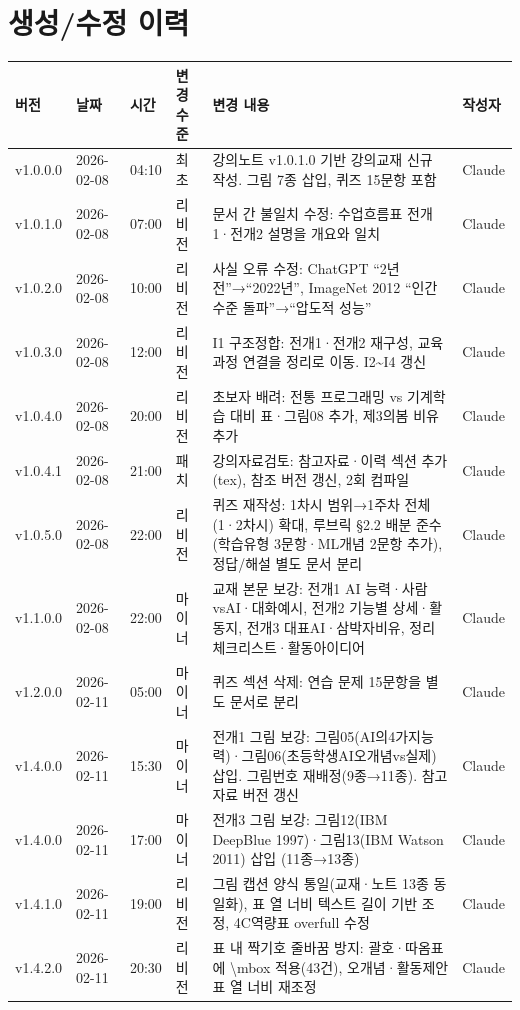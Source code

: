\documentclass[11pt,a4paper]{article}
\renewcommand{\arraystretch}{1.4}
\begin{document}
\section*{생성/수정 이력}

\begin{center}
\renewcommand{\arraystretch}{1.3}
\begin{tabular}{|l|l|l|l|p{4.5cm}|l|}
\hline
\rowcolor{tableheader}
\textbf{버전} & \textbf{날짜} & \textbf{시간} & \textbf{변경 수준} & \textbf{변경 내용} & \textbf{작성자} \\
\hline
v1.0.0.0 & 2026-02-08 & 04:10 & 최초 & 강의노트 v1.0.1.0 기반 강의교재 신규 작성. 그림 7종 삽입, 퀴즈 15문항 포함 & Claude \\
\hline
v1.0.1.0 & 2026-02-08 & 07:00 & 리비전 & 문서 간 불일치 수정: 수업흐름표 전개1·전개2 설명을 개요와 일치 & Claude \\
\hline
v1.0.2.0 & 2026-02-08 & 10:00 & 리비전 & 사실 오류 수정: ChatGPT ``2년 전''→``2022년'', ImageNet 2012 ``인간 수준 돌파''→``압도적 성능'' & Claude \\
\hline
v1.0.3.0 & 2026-02-08 & 12:00 & 리비전 & I1 구조정합: 전개1·전개2 재구성, 교육과정 연결을 정리로 이동. I2\textasciitilde I4 갱신 & Claude \\
\hline
v1.0.4.0 & 2026-02-08 & 20:00 & 리비전 & 초보자 배려: 전통 프로그래밍 vs 기계학습 대비 표·그림08 추가, 제3의봄 비유 추가 & Claude \\
\hline
v1.0.4.1 & 2026-02-08 & 21:00 & 패치 & 강의자료검토: 참고자료·이력 섹션 추가(tex), 참조 버전 갱신, 2회 컴파일 & Claude \\
\hline
v1.0.5.0 & 2026-02-08 & 22:00 & 리비전 & 퀴즈 재작성: 1차시 범위→1주차 전체(1·2차시) 확대, 루브릭 \S 2.2 배분 준수(학습유형 3문항·ML개념 2문항 추가), 정답/해설 별도 문서 분리 & Claude \\
\hline
v1.1.0.0 & 2026-02-08 & 22:00 & 마이너 & 교재 본문 보강: 전개1 AI 능력·사람vsAI·대화예시, 전개2 기능별 상세·활동지, 전개3 대표AI·삼박자비유, 정리 체크리스트·활동아이디어 & Claude \\
\hline
v1.2.0.0 & 2026-02-11 & 05:00 & 마이너 & 퀴즈 섹션 삭제: 연습 문제 15문항을 별도 문서로 분리 & Claude \\
\hline
v1.4.0.0 & 2026-02-11 & 15:30 & 마이너 & 전개1 그림 보강: 그림05(AI의4가지능력)·그림06(초등학생AI오개념vs실제) 삽입. 그림번호 재배정(9종→11종). 참고자료 버전 갱신 & Claude \\
\hline
v1.4.0.0 & 2026-02-11 & 17:00 & 마이너 & 전개3 그림 보강: 그림12(IBM DeepBlue 1997)·그림13(IBM Watson 2011) 삽입 (11종→13종) & Claude \\
\hline
v1.4.1.0 & 2026-02-11 & 19:00 & 리비전 & 그림 캡션 양식 통일(교재·노트 13종 동일화), 표 열 너비 텍스트 길이 기반 조정, 4C역량표 overfull 수정 & Claude \\
\hline
v1.4.2.0 & 2026-02-11 & 20:30 & 리비전 & 표 내 짝기호 줄바꿈 방지: 괄호·따옴표에 \textbackslash mbox 적용(43건), 오개념·활동제안 표 열 너비 재조정 & Claude \\
\hline
\end{tabular}
\end{center}
\end{document}

